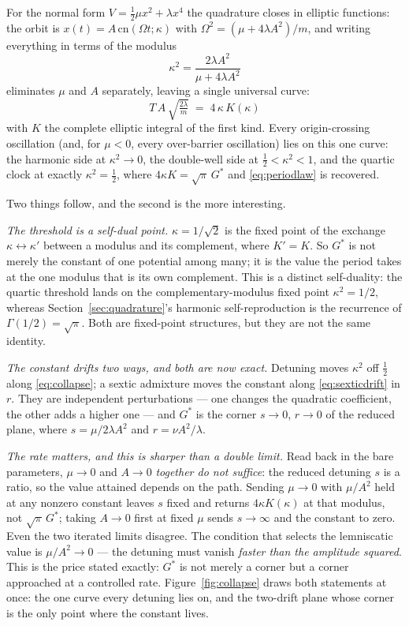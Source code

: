 \documentclass[11pt,a4paper]{article}
\newcommand{\Gstar}{{G^{*}}}
\theoremstyle{definition}
\theoremstyle{plain}
\theoremstyle{remark}
\begin{document}
For the normal form $V = \tfrac12\mu x^2 + \lambda x^4$ the quadrature
closes in elliptic functions: the orbit is $x(t) = A\,\mathrm{cn}(\Omega
t;\kappa)$ with $\Omega^2 = (\mu+4\lambda A^2)/m$, and writing everything
in terms of the modulus
\begin{equation}
\kappa^2 = \frac{2\lambda A^2}{\mu + 4\lambda A^2}
\label{eq:modulus}
\end{equation}
eliminates $\mu$ and $A$ separately, leaving a single universal curve:
\begin{equation}
\boxed{\;T\,A\,\sqrt{\tfrac{2\lambda}{m}} \;=\; 4\,\kappa\,K(\kappa)\;}
\label{eq:collapse}
\end{equation}
with $K$ the complete elliptic integral of the first kind. Every
origin-crossing oscillation (and, for $\mu<0$, every over-barrier
oscillation) lies on this one curve: the harmonic side
at $\kappa^2\to0$, the double-well side at $\tfrac12<\kappa^2<1$, and the
quartic clock at exactly $\kappa^2 = \tfrac12$, where
$4\kappa K = \sqrt\pi\,\Gstar$ and \eqref{eq:periodlaw} is recovered.

Two things follow, and the second is the more interesting.

\emph{The threshold is a self-dual point.} $\kappa = 1/\sqrt2$ is the
fixed point of the exchange $\kappa\leftrightarrow\kappa'$ between a
modulus and its complement, where $K' = K$. So $\Gstar$ is not merely the
constant of one potential among many; it is the value the period takes at
the one modulus that is its own complement. This is a distinct
self-duality: the quartic threshold lands on the complementary-modulus
fixed point $\kappa^2=1/2$, whereas Section~\ref{sec:quadrature}'s harmonic
self-reproduction is the recurrence of $\Gamma(1/2)=\sqrt\pi$. Both are
fixed-point structures, but they are not the same identity.

\emph{The constant drifts two ways, and both are now exact.} Detuning
moves $\kappa^2$ off $\tfrac12$ along \eqref{eq:collapse}; a sextic
admixture moves the constant along \eqref{eq:sexticdrift} in $r$. They
are independent perturbations --- one changes the quadratic coefficient,
the other adds a higher one --- and $\Gstar$ is the corner $s\to0$,
$r\to0$ of the reduced plane, where $s = \mu/2\lambda A^2$ and
$r = \nu A^2/\lambda$.

\emph{The rate matters, and this is sharper than a double limit.} Read
back in the bare parameters, $\mu\to0$ and $A\to0$ \emph{together do not
suffice}: the reduced detuning $s$ is a ratio, so the value attained
depends on the path. Sending $\mu\to0$ with $\mu/A^2$ held at any nonzero
constant leaves $s$ fixed and returns $4\kappa K(\kappa)$ at that
modulus, not $\sqrt\pi\,\Gstar$; taking $A\to0$ first at fixed $\mu$
sends $s\to\infty$ and the constant to zero. Even the two iterated limits
disagree. The condition that selects the lemniscatic value is
$\mu/A^2\to0$ --- the detuning must vanish \emph{faster than the
amplitude squared}. This is the price stated exactly: $\Gstar$ is not
merely a corner but a corner approached at a controlled rate.
Figure~\ref{fig:collapse} draws both statements at once: the one curve
every detuning lies on, and the two-drift plane whose corner is the only
point where the constant lives.
\end{document}
